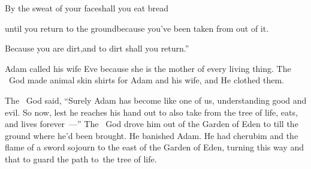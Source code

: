 \begin{inparaenum}
  \pa {} By the sweat of your face\pa shall you eat bread%
  
  \pb until you return to the ground\pa because you've been taken from out of it.%
  
  \pb Because you are dirt,\pa and to dirt shall you return.''%
  
   Adam called his wife Eve because she is the mother of every living thing.%
   The \lord\ God made animal skin shirts for Adam and his wife, and He clothed them.%
  
   The \lord\ God said, ``Surely Adam has become like one of us, understanding good and evil. So now, lest he reaches his hand out to also take from the tree of life, eats, and lives forever~---''%
   The \lord\ God drove him out of the Garden of Eden to till the ground where he'd been brought.%
   He banished Adam. He had cherubim and the flame of a sword sojourn to the east of the Garden of Eden, turning this way and that to guard the path to\understood\ the tree of life.%
\end{inparaenum}
